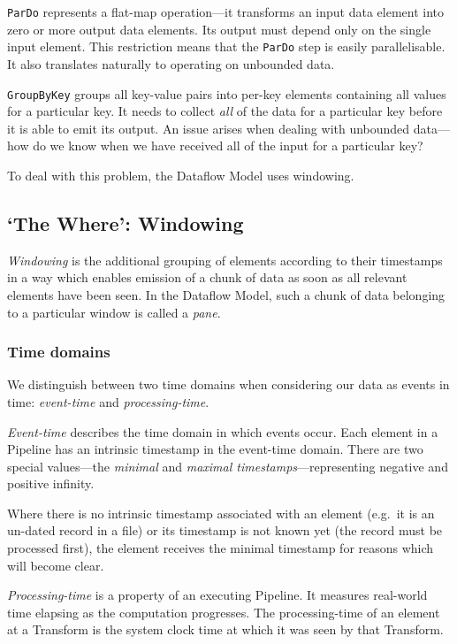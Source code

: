 \verb|ParDo| represents a flat-map operation---it transforms an input data element into zero or more output data elements.
Its output must depend only on the single input element.
This restriction means that the \verb|ParDo| step is easily parallelisable.
It also translates naturally to operating on unbounded data.

\verb|GroupByKey| groups all key-value pairs into per-key elements containing all values for a particular key.
It needs to collect \emph{all} of the data for a particular key before it is able to emit its output.
An issue arises when dealing with unbounded data---how do we know when we have received all of the input for a particular key?

To deal with this problem, the Dataflow Model uses windowing.

\subsection{`The Where': Windowing}\label{sec:prep:dataflow:where}

\emph{Windowing} is the additional grouping of elements according to their timestamps in a way which enables emission of a chunk of data as soon as all relevant elements have been seen.
In the Dataflow Model, such a chunk of data belonging to a particular window is called a \emph{pane}.

\subsubsection{Time domains}

We distinguish between two time domains when considering our data as events in time: \emph{event-time} and \emph{processing-time}.

\emph{Event-time} describes the time domain in which events occur.
Each element in a Pipeline has an intrinsic timestamp in the event-time domain.
There are two special values---the \emph{minimal} and \emph{maximal timestamps}---representing negative and positive infinity.

Where there is no intrinsic timestamp associated with an element (e.g.\ it is an un-dated record in a file) or its timestamp is not known yet (the record must be processed first), the element receives the minimal timestamp for reasons which will become clear.

\emph{Processing-time} is a property of an executing Pipeline.
It measures real-world time elapsing as the computation progresses.
The processing-time of an element at a Transform is the system clock time at which it was seen by that Transform.

